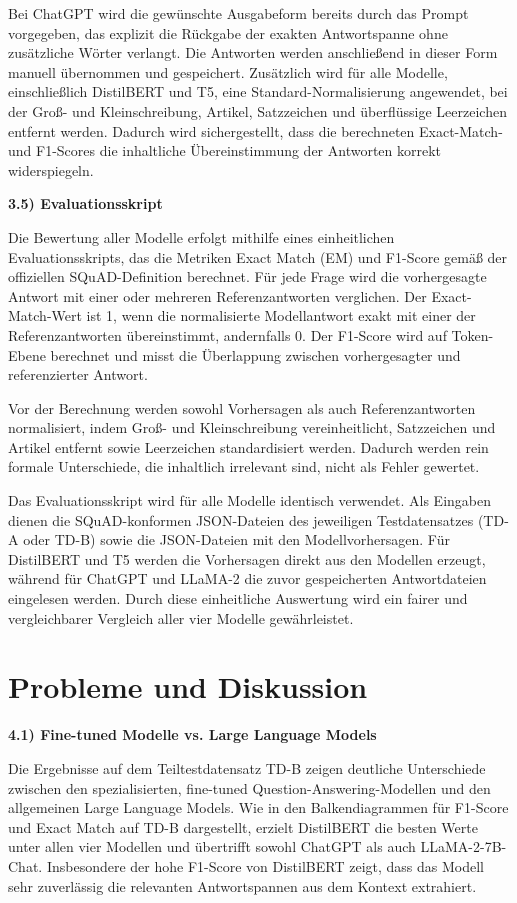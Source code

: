 \documentclass[12pt,oneside]{article}
\begin{document}
Bei ChatGPT wird die gewünschte Ausgabeform bereits durch das Prompt
vorgegeben, das explizit die Rückgabe der exakten Antwortspanne ohne
zusätzliche Wörter verlangt. Die Antworten werden anschließend in dieser
Form manuell übernommen und gespeichert. Zusätzlich wird für alle
Modelle, einschließlich DistilBERT und T5, eine Standard-Normalisierung
angewendet, bei der Groß- und Kleinschreibung, Artikel, Satzzeichen und
überflüssige Leerzeichen entfernt werden. Dadurch wird sichergestellt,
dass die berechneten Exact-Match- und F1-Scores die inhaltliche
Übereinstimmung der Antworten korrekt widerspiegeln.

\textbf{3.5) Evaluationsskript}

Die Bewertung aller Modelle erfolgt mithilfe eines einheitlichen
Evaluationsskripts, das die Metriken Exact Match (EM) und F1-Score gemäß
der offiziellen SQuAD-Definition berechnet. Für jede Frage wird die
vorhergesagte Antwort mit einer oder mehreren Referenzantworten
verglichen. Der Exact-Match-Wert ist 1, wenn die normalisierte
Modellantwort exakt mit einer der Referenzantworten übereinstimmt,
andernfalls 0. Der F1-Score wird auf Token-Ebene berechnet und misst die
Überlappung zwischen vorhergesagter und referenzierter Antwort.

Vor der Berechnung werden sowohl Vorhersagen als auch Referenzantworten
normalisiert, indem Groß- und Kleinschreibung vereinheitlicht,
Satzzeichen und Artikel entfernt sowie Leerzeichen standardisiert
werden. Dadurch werden rein formale Unterschiede, die inhaltlich
irrelevant sind, nicht als Fehler gewertet.

Das Evaluationsskript wird für alle Modelle identisch verwendet. Als
Eingaben dienen die SQuAD-konformen JSON-Dateien des jeweiligen
Testdatensatzes (TD-A oder TD-B) sowie die JSON-Dateien mit den
Modellvorhersagen. Für DistilBERT und T5 werden die Vorhersagen direkt
aus den Modellen erzeugt, während für ChatGPT und LLaMA-2 die zuvor
gespeicherten Antwortdateien eingelesen werden. Durch diese einheitliche
Auswertung wird ein fairer und vergleichbarer Vergleich aller vier
Modelle gewährleistet.
  
  \section{Probleme und Diskussion}
  
  \textbf{4.1) Fine-tuned Modelle vs. Large Language Models}

Die Ergebnisse auf dem Teiltestdatensatz TD-B zeigen deutliche
Unterschiede zwischen den spezialisierten, fine-tuned
Question-Answering-Modellen und den allgemeinen Large Language Models.
Wie in den Balkendiagrammen für F1-Score und Exact Match auf TD-B
dargestellt, erzielt DistilBERT die besten Werte unter allen vier
Modellen und übertrifft sowohl ChatGPT als auch LLaMA-2-7B-Chat.
Insbesondere der hohe F1-Score von DistilBERT zeigt, dass das Modell
sehr zuverlässig die relevanten Antwortspannen aus dem Kontext extrahiert.
\end{document}
